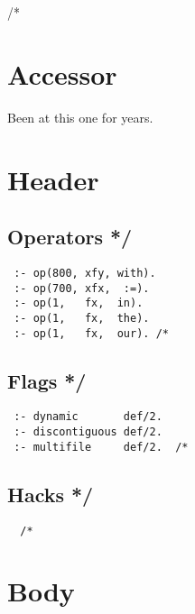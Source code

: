 \documentclass{article}
\begin{document}
\tableofcontents

\clearpage


/*


\section{Accessor\label{Accessor}}


Been at this one for years.

\section{Header\label{Header}}
\subsection*{Operators */\label{Operators_}}
\begin{verbatim}
 :- op(800, xfy, with).
 :- op(700, xfx,  :=).
 :- op(1,   fx,  in).
 :- op(1,   fx,  the).
 :- op(1,   fx,  our). /*
\end{verbatim}
\subsection*{Flags */\label{Flags_}}
\begin{verbatim}
 :- dynamic       def/2.
 :- discontiguous def/2.
 :- multifile     def/2.  /*
\end{verbatim}
\subsection*{Hacks */\label{Hacks_}}
\begin{verbatim}
  /*
\end{verbatim}
\section{Body\label{Body}}
\end{document}
